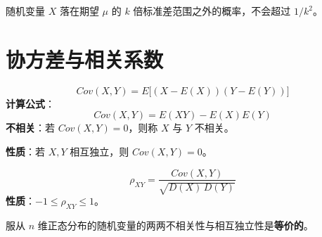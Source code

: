 \begin{tipbox}[通俗理解]
随机变量 $X$ 落在期望 $\mu$ 的 $k$ 倍标准差范围之外的概率，不会超过 $1/k^2$。
\end{tipbox}

\section{协方差与相关系数}
\begin{definition}[协方差]
\begin{equation}
	Cov(X, Y) = E\big[(X - E(X))(Y - E(Y))\big]
	\label{eq:第四章:协方差}
\end{equation}
\textbf{计算公式}：
\begin{equation}
	Cov(X, Y) = E(XY) - E(X)E(Y)
	\label{eq:第四章:协方差计算}
\end{equation}
\textbf{不相关}：若 $Cov(X, Y) = 0$，则称 $X$ 与 $Y$ 不相关。

\textbf{性质}：若 $X, Y$ 相互独立，则 $Cov(X, Y) = 0$。
\end{definition}

\begin{definition}[相关系数]
\begin{equation}
	\rho_{XY} = \frac{Cov(X, Y)}{\sqrt{D(X)\,D(Y)}}
	\label{eq:第四章:相关系数}
\end{equation}
\textbf{性质}：$-1 \le \rho_{XY} \le 1$。
\end{definition}

\begin{keybox}[$n$ 维正态分布的特性]
服从 $n$ 维正态分布的随机变量的两两不相关性与相互独立性是\textbf{等价的}。
\end{keybox}
